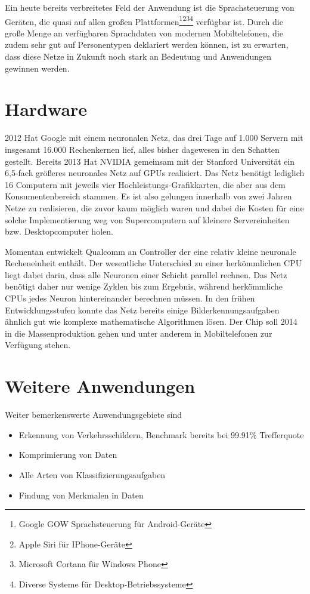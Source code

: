 Ein heute bereits verbreitetes Feld der Anwendung ist die Sprachsteuerung von Geräten, die quasi auf allen großen Plattformen\footnote{Google GOW Sprachsteuerung für Android-Geräte}\footnote{Apple Siri für IPhone-Geräte}\footnote{Microsoft Cortana für Windows Phone}\footnote{Diverse Systeme für Desktop-Betriebssysteme} verfügbar ist. Durch die große Menge an verfügbaren Sprachdaten von modernen Mobiltelefonen, die zudem sehr gut auf Personentypen deklariert werden können, ist zu erwarten, dass diese Netze in Zukunft noch stark an Bedeutung und Anwendungen gewinnen werden.

\section{Hardware}

2012 Hat Google mit einem neuronalen Netz, das drei Tage auf 1.000 Servern mit insgesamt 16.000 Rechenkernen lief, alles bisher dagewesen in den Schatten gestellt. Bereits 2013 Hat NVIDIA gemeinsam mit der Stanford Universität ein 6,5-fach größeres neuronales Netz auf GPUs realisiert. Das Netz benötigt lediglich 16 Computern mit jeweils vier Hochleistungs-Grafikkarten, die aber aus dem Konsumentenbereich stammen. Es ist also gelungen innerhalb von zwei Jahren Netze zu realisieren, die zuvor kaum möglich waren und dabei die Kosten für eine solche Implementierung weg von Supercomputern auf kleinere Servereinheiten bzw. Desktopcomputer holen.

Momentan entwickelt Qualcomm an Controller der eine relativ kleine neuronale Recheneinheit enthält. Der wesentliche Unterschied zu einer herkömmlichen CPU liegt dabei darin, dass alle Neuronen einer Schicht parallel rechnen. Das Netz benötigt daher nur wenige Zyklen bis zum Ergebnis, während herkömmliche CPUs jedes Neuron hintereinander berechnen müssen. In den frühen Entwicklungsstufen konnte das Netz bereits einige Bilderkennungsaufgaben ähnlich gut wie komplexe mathematische Algorithmen lösen. Der Chip soll 2014 in die Massenproduktion gehen und unter anderem in Mobiltelefonen zur Verfügung stehen.

\section{Weitere Anwendungen}

Weiter bemerkenswerte Anwendungsgebiete sind

\begin{itemize}
\item Erkennung von Verkehrsschildern, Benchmark bereits bei 99.91\% Trefferquote \citep{trafficsign}
\item Komprimierung von Daten
\item Alle Arten von Klassifizierungsaufgaben
\item Findung von Merkmalen in Daten
\end{itemize}

